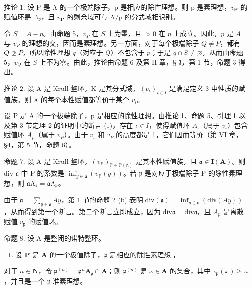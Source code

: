 推论 1. 设 P 是 A 的一个极端除子，p 是相应的除性理想。则 p 是素理想，\(v_{\mathbf{P}}\) 的赋值环是 \(A_{\mathfrak{p}}\)，且 \(v_{\mathbf{P}}\) 的剩余域可与 A/p 的分式域相识别。

令 \(S = A - p\)。由命题 5，\(v_{P}\) 在 \(S\) 上为零，且 \(>0\) 在 \(p\) 上成立。因此，\(p\) 是 \(A\) 与 \(v_{P}\) 的理想的交，因而是素理想。另一方面，对于每个极端除子 \(Q \neq P\)，都有 \(Q \not\geq P\)，所以除性理想 \(q\)（对应于 \(Q\)）不包含于 \(p\)；于是 \(q \cap S \neq \varnothing\)，从而由命题 5，\(v_{Q}\) 在 \(S\) 上不为零。由此，推论由命题 6 及第 II 章，§ 3，第 1 节，命题 3 得出。

推论 2. 设 A 是 Krull 整环，K 是其分式域，\((v_{\iota})_{\iota\in I}\) 是满足定义 3 中性质的赋值族。则 A 的每个本性赋值都等价于某个 \(v_{\iota}\)。

设 P 是 A 的一个极端除子，p 是相应的除性理想。由推论 1、命题 5、引理 1 以及第 3 节定理 2 的证明中的断言 (1)，存在 \(\iota \in I\)，使得赋值环 \(A_{\iota}\)（属于 \(v_{\iota}\)）包含赋值环 \(A_{p}\)（属于 \(v_{P}\)）。由于 \(v_{\iota}\) 和 \(v_{P}\) 的高度都是 1，它们因而等价（第 VI 章，§4，第 5 节，命题 6）。

命题 7. 设 A 是 Krull 整环，\((v_{\mathbb{P}})_{\mathbb{P} \in \mathbb{P}(\mathbb{A})}\) 是其本性赋值族，且 \(\mathfrak{a} \in \mathbf{I}(\mathbf{A})\)。则 div \(\mathfrak{a}\) 中 P 的系数是 \(\inf_{y \in \mathfrak{a}} (v_{\mathbb{P}}(y))\)。若 \(\mathfrak{p}\) 是对应于极端除子 P 的除性素理想，则 \(\mathfrak{a}\mathrm{A}_{\mathfrak{p}} = \tilde{\mathfrak{a}}\mathrm{A}_{\mathfrak{p}}\)。

由于 \(\mathfrak{a} = \sum_{y \in \mathfrak{a}} Ay\)，第 1 节的命题 2 (b) 表明 \(\text{div}(\mathfrak{a}) = \inf_{y \in \mathfrak{a}} (\text{div}(Ay))\)，从而得到第一个断言。第二个断言立即成立，因为 \(\text{div} \tilde{\mathfrak{a}} = \text{div} \mathfrak{a}\)，且 \(A_{\mathfrak{p}}\) 是离散赋值 \(v_{\mathfrak{p}}\) 的赋值环。

命题 8. 设 A 是整闭的诺特整环。

\begin{enumerate}
\def\labelenumi{(\alph{enumi})}
\tightlist
\item
  设 \(\mathbf{P}\) 是 \(\mathbf{A}\) 的一个极值除子，\(\mathfrak{p}\) 是相应的除性素理想；
\end{enumerate}

对于 \(n \in \mathbf{N}\)，令 \(\mathfrak{p}^{(n)} = \mathfrak{p}^n\mathbf{A}_{\mathfrak{p}} \cap \mathbf{A}\)；则 \(\mathfrak{p}^{(n)}\) 是 \(x \in \mathbf{A}\) 的集合，其中 \(v_{\mathfrak{p}}(x) \geqslant n\)，并且是一个 \(\mathfrak{p}\)-准素理想。

